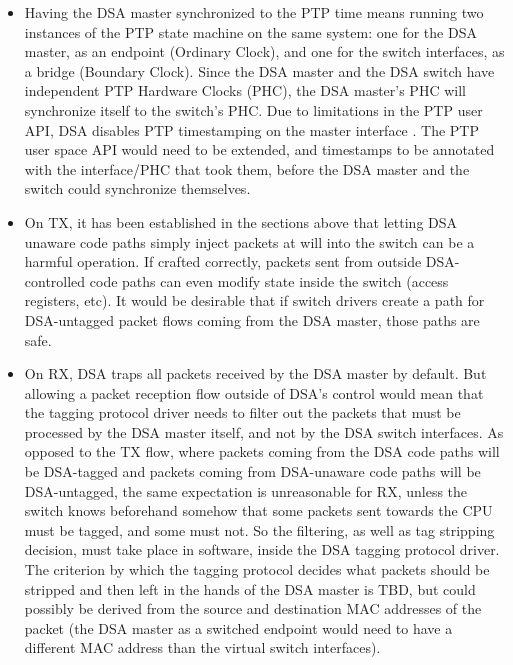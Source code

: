 \documentclass[letterpaper]{article}
\begin{document}
\begin{itemize}
\item Having the DSA master synchronized to the PTP time means running two
      instances of the PTP state machine on the same system: one for the DSA
      master, as an endpoint (Ordinary Clock), and one for the switch
      interfaces, as a bridge (Boundary Clock). Since the DSA master and the
      DSA switch have independent PTP Hardware Clocks (PHC), the DSA master's
      PHC will synchronize itself to the switch's PHC. Due to limitations in
      the PTP user API, DSA disables PTP timestamping on the master interface
      \cite{deny-ptp-on-dsa-master}. The PTP user space API would need to be
      extended, and timestamps to be annotated with the interface/PHC that took
      them, before the DSA master and the switch could synchronize themselves.
\item On TX, it has been established in the sections above that letting DSA
      unaware code paths simply inject packets at will into the switch can be
      a harmful operation. If crafted correctly, packets sent from outside
      DSA-controlled code paths can even modify state inside the switch (access
      registers, etc). It would be desirable that if switch drivers create a
      path for DSA-untagged packet flows coming from the DSA master, those
      paths are safe.
\item On RX, DSA traps all packets received by the DSA master by default. But
      allowing a packet reception flow outside of DSA's control would mean that
      the tagging protocol driver needs to filter out the packets that must be
      processed by the DSA master itself, and not by the DSA switch interfaces.
      As opposed to the TX flow, where packets coming from the DSA code paths
      will be DSA-tagged and packets coming from DSA-unaware code paths will be
      DSA-untagged, the same expectation is unreasonable for RX, unless the
      switch knows beforehand somehow that some packets sent towards the CPU
      must be tagged, and some must not. So the filtering, as well as tag
      stripping decision, must take place in software, inside the DSA tagging
      protocol driver. The criterion by which the tagging protocol decides what
      packets should be stripped and then left in the hands of the DSA master
      is TBD, but could possibly be derived from the source and destination MAC
      addresses of the packet (the DSA master as a switched endpoint would need
      to have a different MAC address than the virtual switch interfaces).
\end{itemize}
\end{document}
